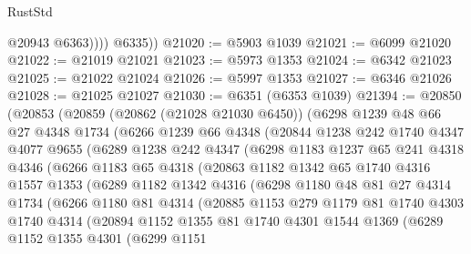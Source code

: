 \begin{lexlean}{RustStd}
\begin{coremodule}
                @20943
                @6363))))
        @6335))
@21020 := @5903 @1039
@21021 := @6099 @21020
@21022 := @21019 @21021
@21023 := @5973 @1353
@21024 := @6342 @21023
@21025 := @21022 @21024
@21026 := @5997 @1353
@21027 := @6346 @21026
@21028 := @21025 @21027
@21030 := @6351 (@6353 @1039)
@21394 := @20850
    (@20853
      (@20859
        (@20862 (@21028 @21030 @6450))
        (@6298
          @1239
          @48
          @66
          @27
          @4348
          @1734
          (@6266
            @1239
            @66
            @4348
            (@20844
              @1238
              @242
              @1740
              @4347
              @4077
              @9655
              (@6289
                @1238
                @242
                @4347
                (@6298
                  @1183
                  @1237
                  @65
                  @241
                  @4318
                  @4346
                  (@6266
                    @1183
                    @65
                    @4318
                    (@20863
                      @1182
                      @1342
                      @65
                      @1740
                      @4316
                      @1557
                      @1353
                      (@6289
                        @1182
                        @1342
                        @4316
                        (@6298
                          @1180
                          @48
                          @81
                          @27
                          @4314
                          @1734
                          (@6266
                            @1180
                            @81
                            @4314
                            (@20885
                              @1153
                              @279
                              @1179
                              @81
                              @1740
                              @4303
                              @1740
                              @4314
                              (@20894
                                @1152
                                @1355
                                @81
                                @1740
                                @4301
                                @1544
                                @1369
                                (@6289
                                  @1152
                                  @1355
                                  @4301
                                  (@6299
                                    @1151

\end{coremodule}
\end{lexlean}

